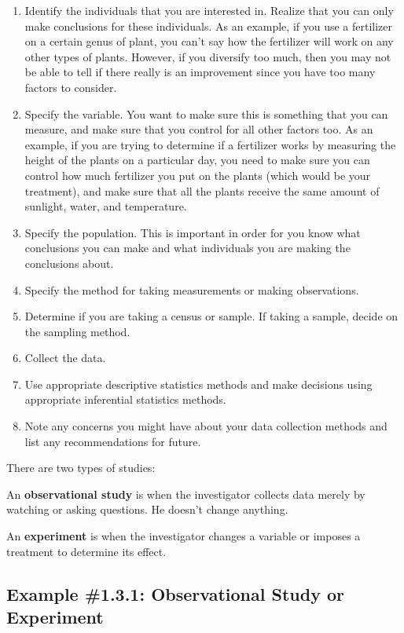 \documentclass[]{book}
\begin{document}
\begin{enumerate}
\def\labelenumi{\arabic{enumi}.}
\item
  Identify the individuals that you are interested in. Realize that
  you can only make conclusions for these individuals. As an example,
  if you use a fertilizer on a certain genus of plant, you can't say
  how the fertilizer will work on any other types of plants. However,
  if you diversify too much, then you may not be able to tell if there
  really is an improvement since you have too many factors to
  consider.
\item
  Specify the variable. You want to make sure this is something that
  you can measure, and make sure that you control for all other
  factors too. As an example, if you are trying to determine if a
  fertilizer works by measuring the height of the plants on a
  particular day, you need to make sure you can control how much
  fertilizer you put on the plants (which would be your treatment),
  and make sure that all the plants receive the same amount of
  sunlight, water, and temperature.
\item
  Specify the population. This is important in order for you know what
  conclusions you can make and what individuals you are making the
  conclusions about.
\item
  Specify the method for taking measurements or making observations.
\item
  Determine if you are taking a census or sample. If taking a sample,
  decide on the sampling method.
\item
  Collect the data.
\item
  Use appropriate descriptive statistics methods and make decisions
  using appropriate inferential statistics methods.
\item
  Note any concerns you might have about your data collection methods
  and list any recommendations for future.
\end{enumerate}

There are two types of studies:

An \textbf{observational study} is when the investigator collects data merely
by watching or asking questions. He doesn't change anything.

An \textbf{experiment} is when the investigator changes a variable or imposes
a treatment to determine its effect.

\hypertarget{example-1.3.1-observational-study-or-experiment}{%
\subsection{Example \#1.3.1: Observational Study or Experiment}\label{example-1.3.1-observational-study-or-experiment}}
\end{document}

